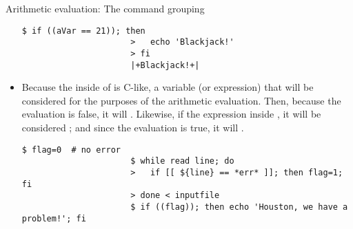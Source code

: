 \begin{frame}[fragile]{Arithmetic evaluation: The command grouping \PB{\texttt{((\ldots))}}}
\begin{overlayarea}{\textwidth}{0.7\textheight}
\begin{itemize}
\begin{lstlisting}[style=MyBash, aboveskip=2mm, belowskip=-6mm, firstnumber=11]
                      $ if ((aVar == 21)); then
                      >   echo 'Blackjack!'
                      > fi
                      |+Blackjack!+|
                  \end{lstlisting}
            \item<only@2> Because the inside of \PB{\texttt{((\ldots))}} is C-like, a variable (or expression) that  will be considered  for the purposes of the arithmetic evaluation.
                  Then, because the evaluation is false, it will .
                  Likewise, if the expression inside \PB{\texttt{((\ldots))}} , it will be considered ; and since the evaluation is true, it will .
                  \begin{lstlisting}[style=MyBash, aboveskip=2mm, belowskip=-6mm, firstnumber=16]
                      $ flag=0  # no error
                      $ while read line; do
                      >   if [[ ${line} == *err* ]]; then flag=1; fi
                      > done < inputfile
                      $ if ((flag)); then echo 'Houston, we have a problem!'; fi
                  \end{lstlisting}
        \end{itemize}
    \end{overlayarea}
\end{frame}


